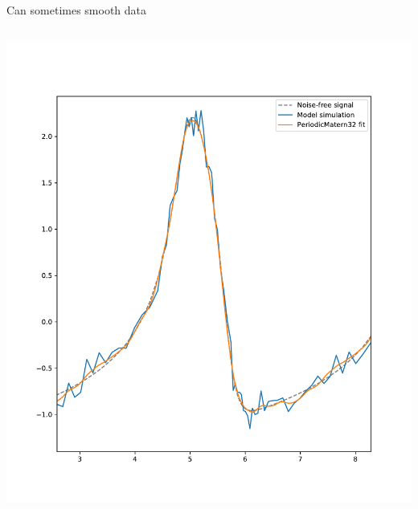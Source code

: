\documentclass[presentation]{beamer}
\begin{document}
\begin{frame}[plain,label={sec:orga64bea2}]{Can sometimes smooth data}
\begin{columns}
\begin{column}{0.5\columnwidth}
\begin{center}
\includegraphics[width=1.1\textwidth]{./Matern2.pdf}
\end{center}
\end{column}
\end{columns}
\end{frame}
\end{document}
